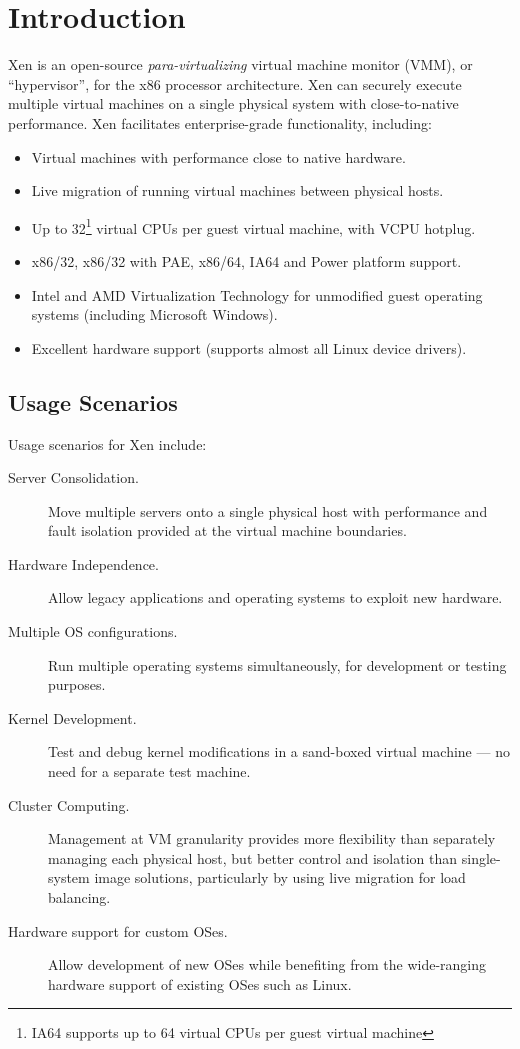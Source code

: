 \documentclass[11pt,twoside,final,openright]{report}
\begin{document}
\chapter{Introduction}


Xen is an open-source \emph{para-virtualizing} virtual machine monitor
(VMM), or ``hypervisor'', for the x86 processor architecture. Xen can
securely execute multiple virtual machines on a single physical system
with close-to-native performance.  Xen facilitates enterprise-grade
functionality, including:

\begin{itemize}
\item Virtual machines with performance close to native hardware.
\item Live migration of running virtual machines between physical hosts.
\item Up to 32\footnote{IA64 supports up to 64 virtual CPUs per guest virtual machine} virtual CPUs per guest virtual machine, with VCPU hotplug.
\item x86/32, x86/32 with PAE, x86/64, IA64 and Power platform support.
\item Intel and AMD Virtualization Technology for unmodified guest operating systems (including Microsoft Windows).
\item Excellent hardware support (supports almost all Linux device
  drivers). 
\end{itemize}


\section{Usage Scenarios}

Usage scenarios for Xen include:

\begin{description}
\item [Server Consolidation.] Move multiple servers onto a single
  physical host with performance and fault isolation provided at the
  virtual machine boundaries.
\item [Hardware Independence.] Allow legacy applications and operating 
  systems to exploit new hardware.
\item [Multiple OS configurations.] Run multiple operating systems
  simultaneously, for development or testing purposes.
\item [Kernel Development.] Test and debug kernel modifications in a
  sand-boxed virtual machine --- no need for a separate test machine.
\item [Cluster Computing.] Management at VM granularity provides more
  flexibility than separately managing each physical host, but better
  control and isolation than single-system image solutions,
  particularly by using live migration for load balancing.
\item [Hardware support for custom OSes.] Allow development of new
  OSes while benefiting from the wide-ranging hardware support of
  existing OSes such as Linux.
\end{description}
\end{document}

